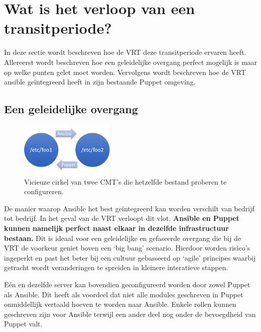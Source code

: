 \section{Wat is het verloop van een transitperiode?}

In deze sectie wordt beschreven hoe de VRT deze transitperiode ervaren heeft. Allereerst wordt beschreven hoe een geleidelijke overgang perfect mogelijk is maar op welke punten gelet moet worden. Vervolgens wordt beschreven hoe de VRT ansible ge\"integreerd heeft in zijn bestaande Puppet omgeving.

\label{sec:methodologie-verloop-transit}
\subsection{Een geleidelijke overgang}


\begin{figure}
\centering
\includegraphics[width=0.4\textwidth]{img/vicieuzecirkel.PNG}
\caption{\label{fig:vicieuzecirkel}Vicieuze cirkel van twee \gls{CMT}'s die hetzelfde bestand proberen te configureren.}
\end{figure}

De manier waarop Ansible het best ge\"integreerd kan worden verschilt van bedrijf tot bedrijf. In het geval van de \gls{VRT} verloopt dit vlot. \textbf{Ansible en Puppet kunnen namelijk perfect naast elkaar in dezelfde infrastructuur bestaan.} Dit is ideaal voor een geleidelijke en gefaseerde overgang die bij de \gls{VRT} de voorkeur geniet boven een `big bang' scenario. Hierdoor worden risico's ingeperkt en past het beter bij een cultuur gebasseerd op `agile' principes waarbij getracht wordt veranderingen te spreiden in kleinere interatieve stappen. 

E\'en en dezelfde server kan bovendien geconfigureerd worden door zowel Puppet als Ansible. Dit heeft als voordeel dat niet alle modules geschreven in Puppet onmiddellijk vertaald hoeven te worden naar Ansible. Enkele rollen kunnen geschreven zijn voor Ansible terwijl een ander deel nog onder de bevoegdheid van Puppet valt.

